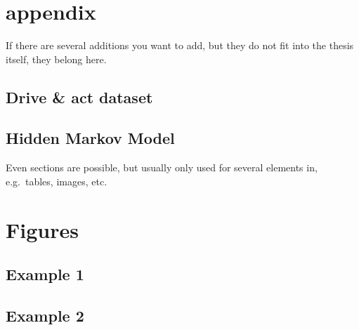 \chapter{appendix}\label{chapter:appendix}

If there are several additions you want to add, but they do not fit into the thesis itself, they belong here.

\section{Drive \& act dataset}
\section{Hidden Markov Model}

Even sections are possible, but usually only used for several elements in, e.g.\ tables, images, etc.

\chapter{Figures}
\section{Example 1}
\cmark
\section{Example 2}
\xmark